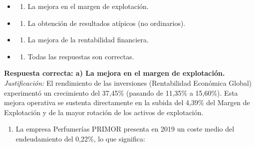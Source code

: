 \documentclass[12pt]{book} %
\providecommand{\tightlist}{%
  \setlength{\itemsep}{0pt}\setlength{\parskip}{0pt}}
\begin{document}
\begin{itemize}
\item
  \begin{enumerate}
  \def\labelenumi{\alph{enumi})}
  \tightlist
  \item
    La mejora en el margen de explotación.
  \end{enumerate}
\item
  \begin{enumerate}
  \def\labelenumi{\alph{enumi})}
  \setcounter{enumi}{1}
  \tightlist
  \item
    La obtención de resultados atípicos (no ordinarios).
  \end{enumerate}
\item
  \begin{enumerate}
  \def\labelenumi{\alph{enumi})}
  \setcounter{enumi}{2}
  \tightlist
  \item
    La mejora de la rentabilidad financiera.
  \end{enumerate}
\item
  \begin{enumerate}
  \def\labelenumi{\alph{enumi})}
  \setcounter{enumi}{3}
  \tightlist
  \item
    Todas las respuestas son correctas.
  \end{enumerate}
\end{itemize}

\textbf{Respuesta correcta: a) La mejora en el margen de explotación.}
\emph{Justificación:} El rendimiento de las inversiones (Rentabilidad
Económica Global) experimentó un crecimiento del 37,45\% (pasando de
11,35\% a 15,60\%). Esta mejora operativa se sustenta directamente en la
subida del 4,39\% del Margen de Explotación y de la mayor rotación de
los activos de explotación.

\begin{enumerate}
\def\labelenumi{\arabic{enumi}.}
\setcounter{enumi}{9}
\tightlist
\item
  La empresa Perfumerías PRIMOR presenta en 2019 un coste medio del
  endeudamiento del 0,22\%, lo que significa:
\end{enumerate}
\end{document}
